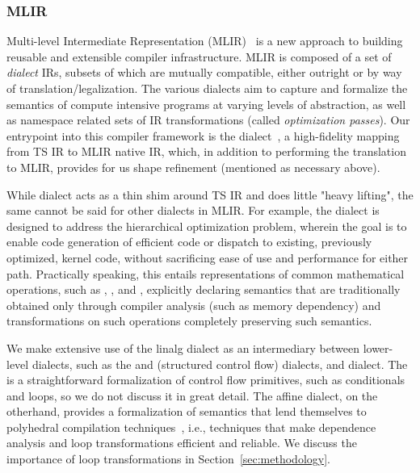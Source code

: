 \subsubsection{MLIR}\label{subsec:mlir}

Multi-level Intermediate Representation (MLIR)~\cite{https://doi.org/10.48550/arxiv.2002.11054} is a new approach to building reusable and extensible compiler infrastructure.
MLIR is composed of a set of \emph{dialect} IRs, subsets of which are mutually compatible, either outright or by way of translation/legalization.
The various dialects aim to capture and formalize the semantics of compute intensive programs at varying levels of abstraction, as well as namespace related sets of IR transformations (called \emph{optimization passes}).
Our entrypoint into this compiler framework is the  dialect~\cite{torch-mlir}, a high-fidelity mapping from TS IR to MLIR native IR, which, in addition to performing the translation to MLIR, provides for us shape refinement (mentioned as necessary above).

While  dialect acts as a thin shim around TS IR and does little "heavy lifting", the same cannot be said for other dialects in MLIR.
For example, the  dialect is designed to address the hierarchical optimization problem, wherein the goal is to enable code generation of efficient code or dispatch to existing, previously optimized, kernel code, without sacrificing ease of use and performance for either path.
Practically speaking, this entails representations of common mathematical operations, such as , , and , explicitly declaring semantics that are traditionally obtained only through compiler analysis (such as memory dependency) and transformations on such operations completely preserving such semantics.

We make extensive use of the linalg dialect as an intermediary between lower-level dialects, such as the  and  (structured control flow) dialects, and  dialect.
The  is a straightforward formalization of control flow primitives, such as conditionals and loops, so we do not discuss it in great detail.
The affine dialect, on the otherhand, provides a formalization of semantics that lend themselves to polyhedral compilation techniques~\cite{polyhedral-mlir}, i.e., techniques that make dependence analysis and loop transformations efficient and reliable.
We discuss the importance of loop transformations in Section~\ref{sec:methodology}.

